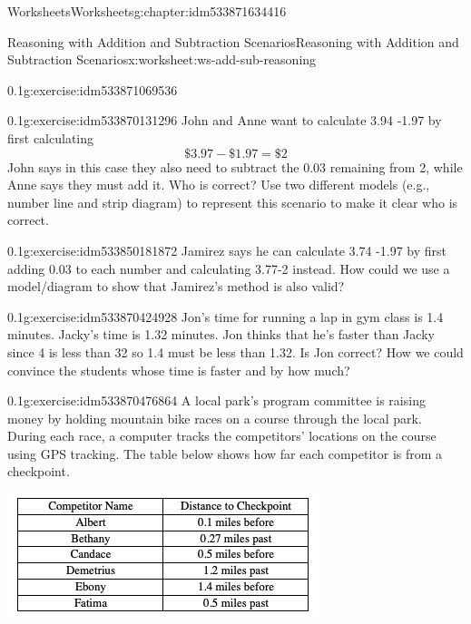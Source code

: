 \documentclass[twoside,11pt,]{book}
\begin{document}
\begin{chapterptx}{Worksheets}{}{Worksheets}{}{}{g:chapter:idm533871634416}
\begin{worksheet-section-numberless}{Reasoning with Addition and Subtraction Scenarios}{}{Reasoning with Addition and Subtraction Scenarios}{}{}{x:worksheet:ws-add-sub-reasoning}
\begin{divisionexercise}{1}{}{0.1}{g:exercise:idm533871069536}
\end{divisionexercise}%
\begin{divisionexercise}{2}{}{0.1}{g:exercise:idm533870131296}%
John and Anne want to calculate \textdollar{}3.94 -\textdollar{}1.97 by first calculating%
\begin{equation*}
\$3.97-\$1.97 = \$2 
\end{equation*}
John says in this case they also need to subtract the \textdollar{}0.03 remaining from \textdollar{}2, while Anne says they must add it.  Who is correct?  Use two different models (e.g., number line and strip diagram) to represent this scenario to make it clear who is correct.%
\end{divisionexercise}%
\begin{divisionexercise}{3}{}{0.1}{g:exercise:idm533850181872}%
Jamirez says he can calculate \textdollar{}3.74 -\textdollar{}1.97 by first adding \textdollar{}0.03 to each number and calculating \textdollar{}3.77-\textdollar{}2 instead.  How could we use a model\slash{}diagram to show that Jamirez’s method is also valid?%
\end{divisionexercise}%
\begin{divisionexercise}{4}{}{0.1}{g:exercise:idm533870424928}%
Jon’s time for running a lap in gym class is 1.4 minutes.  Jacky’s time is 1.32 minutes.  Jon thinks that he’s faster than Jacky since 4 is less than 32 so 1.4 must be less than 1.32.  Is Jon correct?  How we could convince the students whose time is faster and by how much?%
\end{divisionexercise}%
\begin{divisionexercise}{5}{}{0.1}{g:exercise:idm533870476864}%
A local park’s program committee is raising money by holding mountain bike races on a course through the local park.  During each race, a computer tracks the competitors’ locations on the course using GPS tracking.  The table below shows how far each competitor is from a checkpoint.%
\begin{sidebyside}{1}{0.05}{0.05}{0}%
\begin{sbspanel}{0.9}%
\includegraphics[width=1\linewidth]{images/reasoning-table-checkpoint.png}

\end{sbspanel}
\end{sidebyside}
\end{divisionexercise}
\end{worksheet-section-numberless}
\end{chapterptx}
\end{document}
